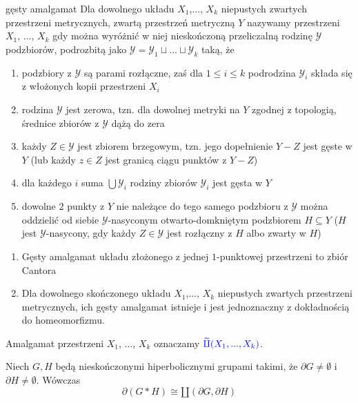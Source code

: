 \begin{definition}{gęsty amalgamat}{}
  Dla dowolnego układu $X_1$,..., $X_k$ niepustych zwartych przestrzeni metrycznych, zwartą przestrzeń metryczną $Y$ nazywamy  przestrzeni $X_1$, ..., $X_k$ gdy można wyróżnić w niej nieskończoną przeliczalną rodzinę $\mathcal{Y}$ podzbiorów, podrozbitą jako $\mathcal{Y}=\mathcal{Y}_1\sqcup ...\sqcup \mathcal{Y}_k$ taką, że 
  \begin{enumerate}
    \item podzbiory z $\mathcal{Y}$ są parami rozłączne, zaś dla $1\leq i\leq k$ podrodzina $\mathcal{Y}_i$ składa się z włożonych kopii przestrzeni $X_i$
    \item rodzina $\mathcal{Y}$ jest zerowa, tzn. dla dowolnej metryki na $Y$ zgodnej z topologią, średnice zbiorów z $\mathcal{Y}$ dążą do zera
    \item każdy $Z\in\mathcal{Y}$ jest zbiorem brzegowym, tzn. jego dopełnienie $Y-Z$ jest gęste w $Y$ (lub każdy $z\in Z$ jest granicą ciągu punktów z $Y-Z$)
    \item dla każdego $i$ suma $\bigcup \mathcal{Y}_i$ rodziny zbiorów $\mathcal{Y}_i$ jest gęsta w $Y$
    \item dowolne $2$ punkty z $Y$ nie należące do tego samego podzbioru z $\mathcal{Y}$ można oddzielić od siebie $\mathcal{Y}$-nasyconym otwarto-domkniętym podzbiorem $H\subseteq Y$ ($H$ jest $\mathcal{Y}$-nasycony, gdy każdy $Z\in\mathcal{Y}$ jest rozłączny z $H$ albo zwarty w $H$)
  \end{enumerate}
\end{definition}

\begin{fact}{}{}
  \begin{enumerate}
    \item Gęsty amalgamat układu złożonego z jednej $1$-punktowej przestrzeni to zbiór Cantora
    \item Dla dowolnego skończonego układu $X_1$,..., $X_k$ niepustych zwartych przestrzeni metrycznych, ich gęsty amalgamat istnieje i jest jednoznaczny z dokładnością do homeomorfizmu.
  \end{enumerate}
\end{fact}

Amalgamat przestrzeni $X_1$, ..., $X_k$ oznaczamy $\color{blue} \amalg (X_1,...,X_k)$.

\begin{lemma}
  Niech $G,H$ będą nieskończonymi hiperbolicznymi grupami takimi, że $\partial G\neq \emptyset$ i $\partial H\neq\emptyset$. Wówczas
  $$\partial (G\ast H)\cong \amalg(\partial G, \partial H) $$
\end{lemma}

